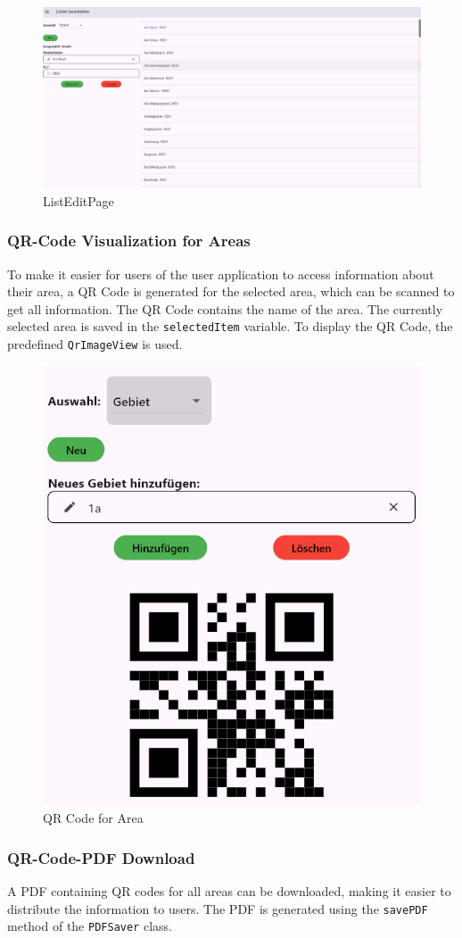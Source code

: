 \begin{figure}[H]
    \centering
    \includegraphics[width=0.9\linewidth]{images/AdminPanel/ListEditPage.png}
    \caption{ListEditPage}
\end{figure}

\subsubsection{QR-Code Visualization for Areas}
To make it easier for users of the user application to access information about their area, a QR Code is generated for the selected area, which can be scanned to get all information. The QR Code contains the name of the area. The currently selected area is saved in the \texttt{selectedItem} variable. To display the QR Code, the predefined \texttt{QrImageView} is used.

\begin{figure}[H]
    \centering
    \includegraphics[width=0.4\linewidth]{images/AdminPanel/QrImageView.png}
    \caption{QR Code for Area}
\end{figure}

\subsubsection{QR-Code-PDF Download}
A PDF containing  QR codes for all areas can be downloaded, making it easier to distribute the information to users. The PDF is generated using the \texttt{savePDF} method of the \texttt{PDFSaver} class.\\

